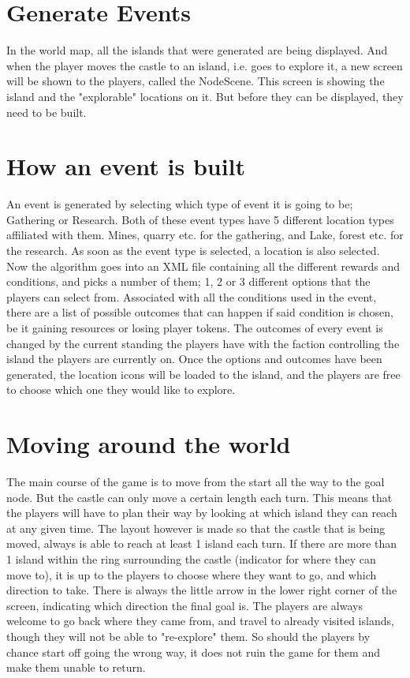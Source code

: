 \documentclass[a4paper,11pt]{report}
\begin{document}
\section{Generate Events}
\label{overviewapp}
In the world map, all the islands that were generated are being displayed. And when the player moves the castle to an island, i.e. goes to explore it, a new screen will be shown to the players, called the NodeScene. This screen is showing the island and the "explorable" locations on it. But before they can be displayed, they need to be built. 

\section{How an event is built}
An event is generated by selecting which type of event it is going to be; Gathering or Research. Both of these event types have 5 different location types affiliated with them. Mines, quarry etc. for the gathering, and Lake, forest etc. for the research. As soon as the event type is selected, a location is also selected. Now the algorithm goes into an XML file containing all the different rewards and conditions, and picks a number of them; 1, 2 or 3 different options that the players can select from. Associated with all the conditions used in the event, there are a list of possible outcomes that can happen if said condition is chosen, be it gaining resources or losing player tokens. The outcomes of every event is changed by the current standing the players have with the faction controlling the island the players are currently on. 
Once the options and outcomes have been generated, the location icons will be loaded to the island, and the players are free to choose which one they would like to explore.

\section{Moving around the world}
The main course of the game is to move from the start all the way to the goal node. But the castle can only move a certain length each turn. This means that the players will have to plan their way by looking at which island they can reach at any given time. The layout however is made so that the castle that is being moved, always is able to reach at least 1 island each turn. If there are more than 1 island within the ring surrounding the castle (indicator for where they can move to), it is up to the players to choose where they want to go, and which direction to take. There is always the little arrow in the lower right corner of the screen, indicating which direction the final goal is. The players are always welcome to go back where they came from, and travel to already visited islands, though they will not be able to "re-explore" them. So should the players by chance start off going the wrong way, it does not ruin the game for them and make them unable to return.
\end{document}
